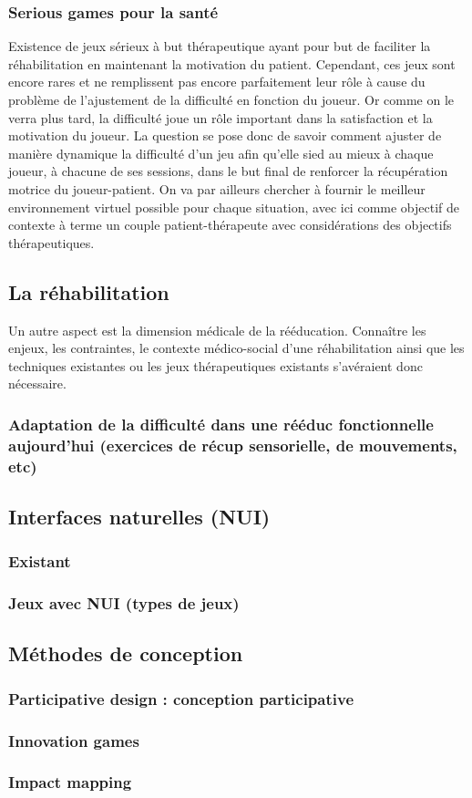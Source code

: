 		\subsubsection{Serious games pour la santé}
Existence de jeux sérieux à but thérapeutique ayant pour but de faciliter la réhabilitation en maintenant la motivation du patient. Cependant, ces jeux sont encore rares et ne remplissent pas encore parfaitement leur rôle à cause du problème de l'ajustement de la difficulté en fonction du joueur.
Or comme on le verra plus tard, la difficulté joue un rôle important dans la satisfaction et la motivation du joueur. La question se pose donc de savoir comment ajuster de manière dynamique la difficulté d'un jeu afin qu'elle sied au mieux à chaque joueur, à chacune de ses sessions, dans le but final de renforcer la récupération motrice du joueur-patient. On va par ailleurs chercher à fournir le meilleur environnement virtuel possible pour chaque situation, avec ici comme objectif de contexte à terme un couple patient-thérapeute avec considérations des objectifs thérapeutiques. 		
	\subsection{La réhabilitation}
Un autre aspect est la dimension médicale de la rééducation. Connaître les enjeux, les contraintes, le contexte médico-social d'une réhabilitation ainsi que les techniques existantes ou les jeux thérapeutiques existants s'avéraient donc nécessaire.
	
		\subsubsection{Adaptation de la difficulté dans une rééduc fonctionnelle aujourd'hui (exercices de récup sensorielle, de mouvements, etc)}
		
		
	\subsection{Interfaces naturelles (NUI)}
		\subsubsection{Existant}
		
		\subsubsection{Jeux avec NUI (types de jeux)}
		
		
	\subsection{Méthodes de conception}
		\subsubsection{Participative design : conception participative}
		
		\subsubsection{Innovation games}
		
		\subsubsection{Impact mapping}